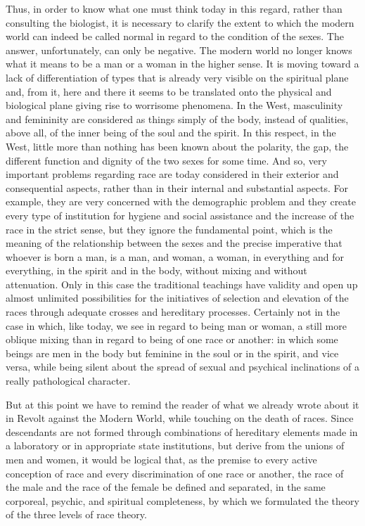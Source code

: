 Thus, in order to know what one must think today in this regard, rather than consulting the biologist, it is necessary to clarify the extent to which the modern world can indeed be called normal in regard to the condition of the sexes. The answer, unfortunately, can only be negative. The modern world no longer knows what it means to be a man or a woman in the higher sense. It is moving toward a lack of differentiation of types that is already very visible on the spiritual plane and, from it, here and there it seems to be translated onto the physical and biological plane giving rise to worrisome phenomena. In the West, masculinity and femininity are considered as things simply of the body, instead of qualities, above all, of the inner being of the soul and the spirit. In this respect, in the West, little more than nothing has been known about the polarity, the gap, the different function and dignity of the two sexes for some time. And so, very important problems regarding race are today considered in their exterior and consequential aspects, rather than in their internal and substantial aspects. For example, they are very concerned with the demographic problem and they create every type of institution for hygiene and social assistance and the increase of the race in the strict sense, but they ignore the fundamental point, which is the meaning of the relationship between the sexes and the precise imperative that whoever is born a man, is a man, and woman, a woman, in everything and for everything, in the spirit and in the body, without mixing and without attenuation. Only in this case the traditional teachings have validity and open up almost unlimited possibilities for the initiatives of selection and elevation of the races through adequate crosses and hereditary processes. Certainly not in the case in which, like today, we see in regard to being man or woman, a still more oblique mixing than in regard to being of one race or another: in which some beings are men in the body but feminine in the soul or in the spirit, and vice versa, while being silent about the spread of sexual and psychical inclinations of a really pathological character.

But at this point we have to remind the reader of what we already wrote about it in Revolt against the Modern World, while touching on the death of races. Since descendants are not formed through combinations of hereditary elements made in a laboratory or in appropriate state institutions, but derive from the unions of men and women, it would be logical that, as the premise to every active conception of race and every discrimination of one race or another, the race of the male and the race of the female be defined and separated, in the same corporeal, psychic, and spiritual completeness, by which we formulated the theory of the three levels of race theory.

